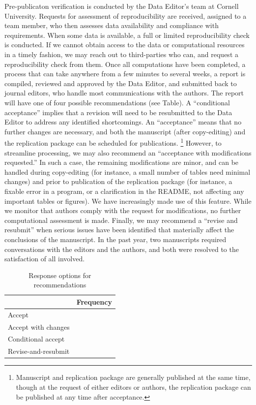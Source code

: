 \documentclass[PP]{AEA}
\begin{document}
Pre-publicaton verification is conducted by the Data Editor's team at Cornell University. 
Requests for assessment of reproducibility are received, assigned to a team member, who then assesses data availability and compliance with requirements. When some data is available, a full or limited reproducibility check is conducted. If we cannot obtain access to the data or computational resources in a timely fashion, we may reach out to third-parties who can, and request a reproducibility check from them. Once all computations have been completed, a process that can take anywhere from a few minutes to several weeks, a report is compiled, reviewed and approved by the Data Editor, and submitted back to journal editors, who handle most communications with the authors. The report will have  one of four possible recommendations (see Table). A ``conditional acceptance'' implies that a revision will need to be resubmitted to the Data Editor to address any identified shortcomings. An ``acceptance'' means that no further changes are necessary, and both the manuscript (after copy-editing) and the replication package can be scheduled for publications.%
%
\footnote{Manuscript and replication package are generally published at the same time, though at the request of either editors or authors, the replication package can be published at any time after acceptance.} 
%
However, to streamline processing, we may also recommend an ``acceptance with modifications requested.'' In such a case, the remaining modifications are minor, and can be handled during copy-editing (for instance, a small number of tables need minimal changes) and prior to publication of the replication package (for instance, a fixable error in a program, or a clarification in the README, not affecting any important tables or figures). We have increasingly made use of this feature. While we monitor that authors comply with the request for modifications, no further computational assessment is made. Finally, we may recommend a ``revise and resubmit'' when serious issues have been identified that materially affect the conclusions of the manuscript. In the past year, two manuscripts required conversations with the editors and the authors, and both were resolved to the satisfaction of all involved.

\begin{table}[t]
    \caption{Response options for recommendations}
    \label{tab:responses}
    \centering
    \begin{tabular}{lr}
    \toprule
               & Frequency \\
               \midrule
        Accept &  \\
        Accept with changes &\\
        Conditional accept &\\
        Revise-and-resubmit & \\
        \bottomrule
    \end{tabular}
\end{table}
\end{document}
